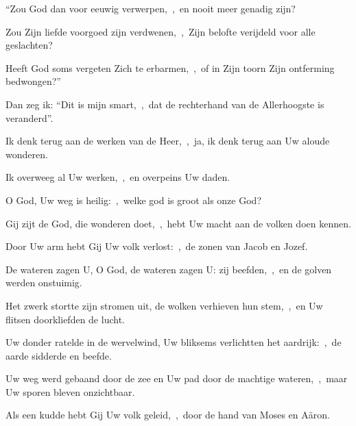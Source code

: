 \documentclass[12pt,twoside,a5paper]{article}
\begin{document}
\begin{halfparskip}

  ``Zou God dan voor eeuwig verwerpen,~\sep\ en nooit meer genadig zijn?

  Zou Zijn liefde voorgoed zijn verdwenen,~\sep\ Zijn belofte verijdeld voor alle geslachten?

  Heeft God soms vergeten Zich te erbarmen,~\sep\ of in Zijn toorn Zijn ontferming bedwongen?''

  Dan zeg ik: ``Dit is mijn smart,~\sep\ dat de rechterhand van de Allerhoogste is veranderd''.

  Ik denk terug aan de werken van de Heer,~\sep\ ja, ik denk terug aan Uw aloude wonderen.

  Ik overweeg al Uw werken,~\sep\ en overpeins Uw daden.
\end{halfparskip}

\begin{halfparskip}

  O God, Uw weg is heilig:~\sep\ welke god is groot als onze God?

  Gij zijt de God, die wonderen doet,~\sep\ hebt Uw macht aan de volken doen kennen.

  Door Uw arm hebt Gij Uw volk verlost:~\sep\ de zonen van Jacob en Jozef.

  De wateren zagen U, O God, de wateren zagen U: zij beefden,~\sep\ en de golven werden onstuimig.

  Het zwerk stortte zijn stromen uit, de wolken verhieven hun stem,~\sep\ en Uw flitsen doorkliefden de lucht.

  Uw donder ratelde in de wervelwind, Uw bliksems verlichtten het aardrijk:~\sep\ de aarde sidderde en beefde.

  Uw weg werd gebaand door de zee en Uw pad door de machtige wateren,~\sep\ maar Uw sporen bleven onzichtbaar.

  Als een kudde hebt Gij Uw volk geleid,~\sep\ door de hand van Moses en Aäron.
\end{halfparskip}

\end{document}
